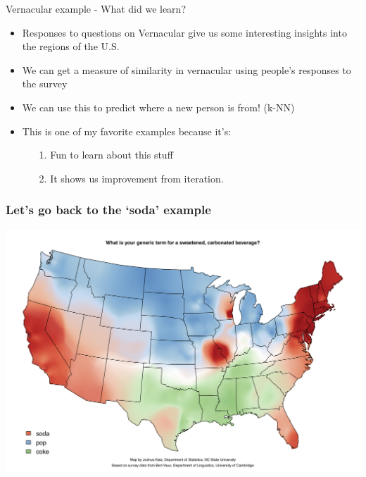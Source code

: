 \documentclass{beamer} %
\newcommand{\1}{\mathbb{1}}
\begin{document}
\begin{frame}[t]{Vernacular example - What did we learn?}
\begin{itemize}
	\item Responses to questions on Vernacular give us some interesting insights into the regions of the U.S.
	\item We can get a measure of similarity in vernacular using people's responses to the survey
	\item We can use this to predict where a new person is from! (k-NN)
	\item[]
	\item This is one of my favorite examples because it's:
	\begin{itemize}
		\item[1.] Fun to learn about this stuff
		\item[2.] It shows us improvement from iteration.
	\end{itemize}
\end{itemize}
\end{frame}

\begin{frame}[t]\frametitle{Let's go back to the `soda' example}
\includegraphics[scale = 0.4]{./visualization/sodapopcoke.png}
\end{frame}
\end{document}
